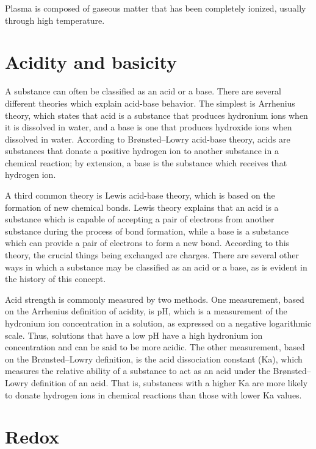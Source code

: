\documentclass[
]{book}
\begin{document}
Plasma is composed of gaseous matter that has been completely ionized, usually through high temperature.

\hypertarget{acidity-and-basicity}{%
\section{Acidity and basicity}\label{acidity-and-basicity}}

A substance can often be classified as an acid or a base. There are several different theories which explain acid-base behavior. The simplest is Arrhenius theory, which states that acid is a substance that produces hydronium ions when it is dissolved in water, and a base is one that produces hydroxide ions when dissolved in water. According to Brønsted--Lowry acid-base theory, acids are substances that donate a positive hydrogen ion to another substance in a chemical reaction; by extension, a base is the substance which receives that hydrogen ion.

A third common theory is Lewis acid-base theory, which is based on the formation of new chemical bonds. Lewis theory explains that an acid is a substance which is capable of accepting a pair of electrons from another substance during the process of bond formation, while a base is a substance which can provide a pair of electrons to form a new bond. According to this theory, the crucial things being exchanged are charges. There are several other ways in which a substance may be classified as an acid or a base, as is evident in the history of this concept.

Acid strength is commonly measured by two methods. One measurement, based on the Arrhenius definition of acidity, is pH, which is a measurement of the hydronium ion concentration in a solution, as expressed on a negative logarithmic scale. Thus, solutions that have a low pH have a high hydronium ion concentration and can be said to be more acidic. The other measurement, based on the Brønsted--Lowry definition, is the acid dissociation constant (Ka), which measures the relative ability of a substance to act as an acid under the Brønsted--Lowry definition of an acid. That is, substances with a higher Ka are more likely to donate hydrogen ions in chemical reactions than those with lower Ka values.

\hypertarget{redox}{%
\section{Redox}\label{redox}}
\end{document}
